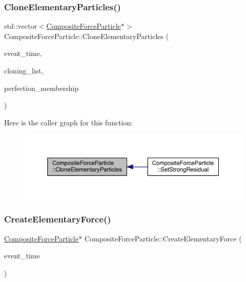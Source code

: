 \subsubsection{\texorpdfstring{Clone\+Elementary\+Particles()}{CloneElementaryParticles()}}
{\footnotesize\ttfamily std\+::vector$<$\hyperlink{class_composite_force_particle}{Composite\+Force\+Particle}$\ast$$>$ Composite\+Force\+Particle\+::\+Clone\+Elementary\+Particles (\begin{DoxyParamCaption}\item[{std\+::chrono\+::time\+\_\+point$<$ \hyperlink{universe_8h_a0ef8d951d1ca5ab3cfaf7ab4c7a6fd80}{Clock} $>$}]{event\+\_\+time,  }\item[{std\+::vector$<$ \hyperlink{class_composite_force_particle}{Composite\+Force\+Particle} $\ast$$>$}]{cloning\+\_\+list,  }\item[{double}]{perfection\+\_\+membership }\end{DoxyParamCaption})}

Here is the caller graph for this function\+:\nopagebreak
\begin{figure}[H]
\begin{center}
\leavevmode
\includegraphics[width=350pt]{class_composite_force_particle_ac27e6d3bb56272728a8c197dbcd2db4e_icgraph}
\end{center}
\end{figure}
\mbox{\label{class_composite_force_particle_a490b3eed8b9dbcc3edf44a9747ef6dbb}} 
\subsubsection{\texorpdfstring{Create\+Elementary\+Force()}{CreateElementaryForce()}}
{\footnotesize\ttfamily \hyperlink{class_composite_force_particle}{Composite\+Force\+Particle}$\ast$ Composite\+Force\+Particle\+::\+Create\+Elementary\+Force (\begin{DoxyParamCaption}\item[{std\+::chrono\+::time\+\_\+point$<$ \hyperlink{universe_8h_a0ef8d951d1ca5ab3cfaf7ab4c7a6fd80}{Clock} $>$}]{event\+\_\+time }\end{DoxyParamCaption})}

